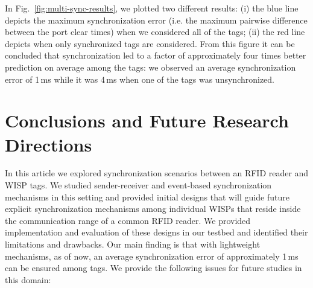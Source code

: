 \documentclass[journal,draftcls,onecolumn,12pt,twoside]{IEEEtranTCOM}
\begin{document}
In Fig.~\ref{fig:multi-sync-results}, we plotted two different results: (i) the blue line depicts the maximum synchronization error (i.e. the maximum pairwise difference between the port clear times) when we considered all of the tags; (ii) the red line depicts when only synchronized tags are considered. From this figure it can be concluded that synchronization led to a factor of approximately four times better prediction on average among the tags: we observed an average synchronization error of 1\,ms while it was 4\,ms when one of the tags was unsynchronized.  

\section{Conclusions and Future Research Directions}
\label{sec:Conclusion}

In this article we explored synchronization scenarios between an RFID reader and WISP tags. We studied sender-receiver and event-based synchronization mechanisms in this setting and provided initial designs that will guide future explicit synchronization mechanisms among individual WISPs that reside inside the communication range of a common RFID reader. We provided implementation and evaluation of these designs in our testbed and identified their limitations and drawbacks. Our main finding is that with lightweight mechanisms, as of now, an average synchronization error of approximately 1\,ms can be ensured among tags. We provide the following issues for future studies in this domain:
\end{document}
